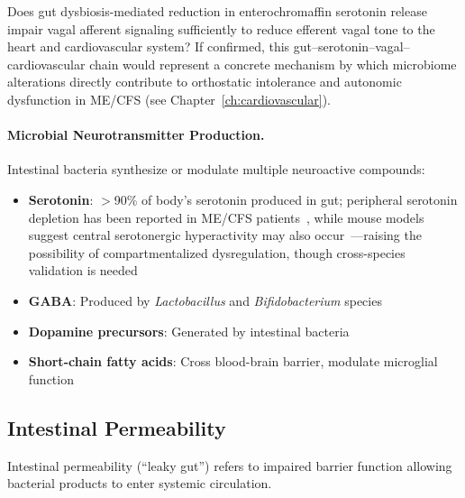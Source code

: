 \begin{open_question}
\label{oq:gut-serotonin-vagal}
Does gut dysbiosis-mediated reduction in enterochromaffin serotonin release impair vagal afferent signaling sufficiently to reduce efferent vagal tone to the heart and cardiovascular system? If confirmed, this gut--serotonin--vagal--cardiovascular chain would represent a concrete mechanism by which microbiome alterations directly contribute to orthostatic intolerance and autonomic dysfunction in ME/CFS (see Chapter~\ref{ch:cardiovascular}).
\end{open_question}

\paragraph{Microbial Neurotransmitter Production.}

Intestinal bacteria synthesize or modulate multiple neuroactive compounds:
\begin{itemize}
    \item \textbf{Serotonin}: $>$90\% of body's serotonin produced in gut; peripheral serotonin depletion has been reported in ME/CFS patients~\cite{Simonato2021tryptophan}, while mouse models suggest central serotonergic hyperactivity may also occur~\cite{Lee2024serotonin}---raising the possibility of compartmentalized dysregulation, though cross-species validation is needed
    \item \textbf{GABA}: Produced by \textit{Lactobacillus} and \textit{Bifidobacterium} species
    \item \textbf{Dopamine precursors}: Generated by intestinal bacteria
    \item \textbf{Short-chain fatty acids}: Cross blood-brain barrier, modulate microglial function
\end{itemize}

\subsection{Intestinal Permeability}
\label{sec:leaky-gut}

Intestinal permeability (``leaky gut'') refers to impaired barrier function allowing bacterial products to enter systemic circulation.

